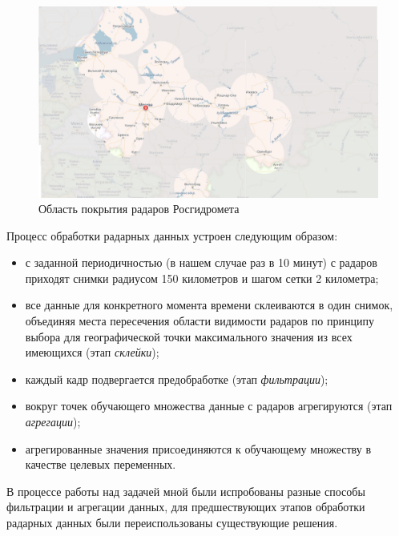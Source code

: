 \documentclass[14pt]{matmex-diploma}
\begin{document}
\begin{figure}
\centering
\includegraphics[width=\linewidth]{images/pic5_radars_map.png}
\caption{Область покрытия радаров Росгидромета}
\label{pic5_radars_map}
\end{figure}


Процесс обработки радарных данных устроен следующим образом:
\begin{itemize}
    \item с заданной периодичностью (в нашем случае раз в 10 минут) с радаров приходят снимки радиусом 150 километров и шагом сетки 2 километра;
    \item все данные для конкретного момента времени склеиваются в один снимок, объединяя места пересечения области видимости радаров по принципу выбора для географической точки максимального значения из всех имеющихся (этап \textit{склейки});
    \item каждый кадр подвергается предобработке (этап \textit{фильтрации});
    \item вокруг точек обучающего множества данные с радаров агрегируются (этап \textit{агрегации});
    \item агрегированные значения присоединяются к обучающему множеству в качестве целевых переменных.
\end{itemize}

В процессе работы над задачей мной были испробованы разные способы фильтрации и агрегации данных, для предшествующих этапов обработки радарных данных были переиспользованы существующие решения.   %
\end{document}
